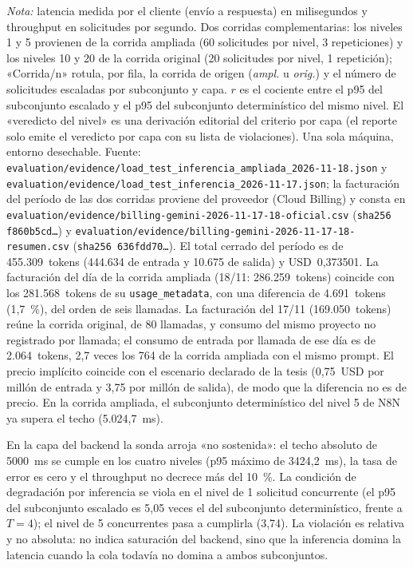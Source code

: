 \begin{table}[htbp]
{\footnotesize\textit{Nota:} latencia medida por el cliente (envío a respuesta) en milisegundos y throughput en solicitudes por segundo. Dos corridas complementarias: los niveles 1 y 5 provienen de la corrida ampliada (60 solicitudes por nivel, 3 repeticiones) y los niveles 10 y 20 de la corrida original (20 solicitudes por nivel, 1 repetición); «Corrida/n» rotula, por fila, la corrida de origen (\emph{ampl.} u \emph{orig.}) y el número de solicitudes escaladas por subconjunto y capa. \(r\) es el cociente entre el p95 del subconjunto escalado y el p95 del subconjunto determinístico del mismo nivel. El «veredicto del nivel» es una derivación editorial del criterio por capa (el reporte solo emite el veredicto por capa con su lista de violaciones). Una sola máquina, entorno desechable. Fuente: \texttt{evaluation/evidence/load\_test\_inferencia\_ampliada\_2026-11-18.json} y \texttt{evaluation/evidence/load\_test\_inferencia\_2026-11-17.json}; la facturación del período de las dos corridas proviene del proveedor (Cloud Billing) y consta en \texttt{evaluation/evidence/billing-gemini-2026-11-17-18-oficial.csv} (\texttt{sha256 f860b5cd\ldots}) y \texttt{evaluation/evidence/billing-gemini-2026-11-17-18-resumen.csv} (\texttt{sha256 636fdd70\ldots}). El total cerrado del período es de 455.309~tokens (444.634 de entrada y 10.675 de salida) y USD~0,373501. La facturación del día de la corrida ampliada (18/11: 286.259~tokens) coincide con los 281.568~tokens de su \texttt{usage\_metadata}, con una diferencia de 4.691~tokens (1,7~\%), del orden de seis llamadas. La facturación del 17/11 (169.050~tokens) reúne la corrida original, de 80 llamadas, y consumo del mismo proyecto no registrado por llamada; el consumo de entrada por llamada de ese día es de 2.064~tokens, 2,7 veces los 764 de la corrida ampliada con el mismo prompt. El precio implícito coincide con el escenario declarado de la tesis (0,75~USD por millón de entrada y 3,75 por millón de salida), de modo que la diferencia no es de precio. En la corrida ampliada, el subconjunto determinístico del nivel 5 de N8N ya supera el techo (5.024,7~ms).}
\end{table}

En la capa del backend la sonda arroja «no sostenida»: el techo absoluto de 5000~ms se cumple en los cuatro niveles (p95 máximo de 3424,2~ms), la tasa de error es cero y el throughput no decrece más del 10~\%. La condición de degradación por inferencia se viola en el nivel de 1 solicitud concurrente (el p95 del subconjunto escalado es 5,05 veces el del subconjunto determinístico, frente a $T = 4$); el nivel de 5 concurrentes pasa a cumplirla (3,74). La violación es relativa y no absoluta: no indica saturación del backend, sino que la inferencia domina la latencia cuando la cola todavía no domina a ambos subconjuntos.


